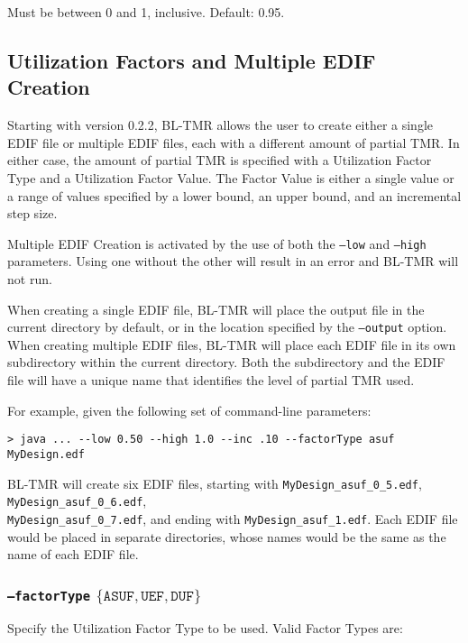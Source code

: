 \documentclass[english]{article}
\begin{document}
Must be between 0 and 1, inclusive. Default: 0.95.

\subsection{Utilization Factors and Multiple EDIF Creation}
Starting with version 0.2.2, BL-TMR allows the user to create either a single 
EDIF file or multiple EDIF files, each with a different amount of partial TMR.
In either case, the amount of partial TMR is specified with a Utilization Factor
Type and a Utilization Factor Value.  The Factor Value is either a single value
or a range of values specified by a lower bound, an upper bound, and an 
incremental step size.

Multiple EDIF Creation is activated by the use of both the \texttt{--low} and
\texttt{--high} parameters.  Using one without the other will result in an error
and BL-TMR will not run.

When creating a single EDIF file, BL-TMR will place the output file in the
current directory by default, or in the location specified by the
\texttt{--output} option. When creating multiple EDIF files, BL-TMR will place
each EDIF file in its own subdirectory within the current directory. Both the 
subdirectory and the EDIF file will have a unique name that identifies the level
of partial TMR used.  

For example, given the following set of command-line parameters: 

\begin{verbatim}
> java ... --low 0.50 --high 1.0 --inc .10 --factorType asuf MyDesign.edf
\end{verbatim} 
BL-TMR will create six EDIF files, starting with 
\texttt{MyDesign\_asuf\_0\_5.edf}, \texttt{MyDesign\_asuf\_0\_6.edf}, 
\\\texttt{MyDesign\_asuf\_0\_7.edf}, and ending with 
\texttt{MyDesign\_asuf\_1.edf}. Each EDIF file would be placed in separate 
directories, whose names would be the same as the name of each EDIF file.

\subsubsection{\texttt{--factorType} $\{ \mathtt{ASUF},\mathtt{UEF},\mathtt{DUF} \}$ }
Specify the Utilization Factor Type to be used. Valid Factor Types are:
\end{document}
